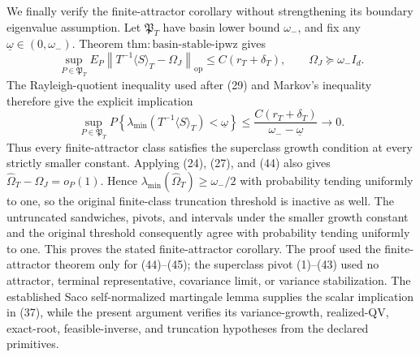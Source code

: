 We finally verify the finite-attractor corollary without strengthening its boundary eigenvalue assumption. Let \(\mathfrak P_T\) have basin lower bound \(\omega_-\), and fix any \(\underline\omega\in(0,\omega_-)\). Theorem \(\mathrm{thm:basin\text{-}stable\text{-}ipwz}\) gives
\[
 \sup_{P\in\mathfrak P_T}E_P\left\|T^{-1}\langle S\rangle_T-\Omega_J\right\|_{\mathrm{op}}
 \le C(r_T+\delta_T),
 \qquad \Omega_J\succeq\omega_-I_d.
\tag{44}
\]
The Rayleigh-quotient inequality used after (29) and Markov's inequality therefore give the explicit implication
\[
 \sup_{P\in\mathfrak P_T}
 P\!\left\{\lambda_{\min}(T^{-1}\langle S\rangle_T)<\underline\omega\right\}
 \le\frac{C(r_T+\delta_T)}{\omega_--\underline\omega}
 \longrightarrow0.
\tag{45}
\]
Thus every finite-attractor class satisfies the superclass growth condition at every strictly smaller constant. Applying (24), (27), and (44) also gives \(\widehat\Omega_T-\Omega_J=o_P(1)\). Hence \(\lambda_{\min}(\widehat\Omega_T)\ge\omega_-/2\) with probability tending uniformly to one, so the original finite-class truncation threshold is inactive as well. The untruncated sandwiches, pivots, and intervals under the smaller growth constant and the original threshold consequently agree with probability tending uniformly to one. This proves the stated finite-attractor corollary. The proof used the finite-attractor theorem only for (44)--(45); the superclass pivot (1)--(43) used no attractor, terminal representative, covariance limit, or variance stabilization. The established Saco self-normalized martingale lemma supplies the scalar implication in (37), while the present argument verifies its variance-growth, realized-QV, exact-root, feasible-inverse, and truncation hypotheses from the declared primitives.
